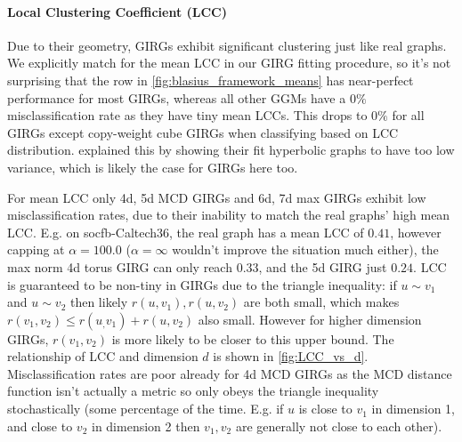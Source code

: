 


\paragraph{Local Clustering Coefficient (LCC)} Due to their geometry, GIRGs exhibit significant clustering just like real graphs. We explicitly match for the mean LCC in our GIRG fitting procedure, so it's not surprising that the  row in \cref{fig:blasius_framework_means} has near-perfect performance for most GIRGs, whereas all other GGMs have a $0\%$ misclassification rate as they have tiny mean LCCs. This drops to $0\%$ for all GIRGs except copy-weight cube GIRGs when classifying based on LCC distribution. \cite{blasius2018towards} explained this by showing their fit hyperbolic graphs to have too low variance, which is likely the case for GIRGs here too.

For mean LCC only 4d, 5d MCD GIRGs and 6d, 7d max GIRGs exhibit low misclassification rates, due to their inability to match the real graphs' high mean LCC. E.g. on socfb-Caltech36, the real graph has a mean LCC of $0.41$, however capping at $\alpha=100.0$ ($\alpha=\infty$ wouldn't improve the situation much either), the max norm 4d torus GIRG can only reach $0.33$, and the 5d GIRG just $0.24$. LCC is guaranteed to be non-tiny in GIRGs due to the triangle inequality: if $u \sim v_1$ and $u \sim v_2$ then likely $r(u, v_1), r(u, v_2)$ are both small, which makes $r(v_1, v_2) \leq r(u_, v_1) + r(u, v_2)$ also small. However for higher dimension GIRGs, $r(v_1, v_2)$ is more likely to be closer to this upper bound. The relationship of LCC and dimension $d$ is shown in \cref{fig:LCC_vs_d}. Misclassification rates are poor already for 4d MCD GIRGs as the MCD distance function isn't actually a metric so only obeys the triangle inequality stochastically (some percentage of the time. E.g. if $u$ is close to $v_1$ in dimension 1, and close to $v_2$ in dimension 2 then $v_1, v_2$ are generally not close to each other).


